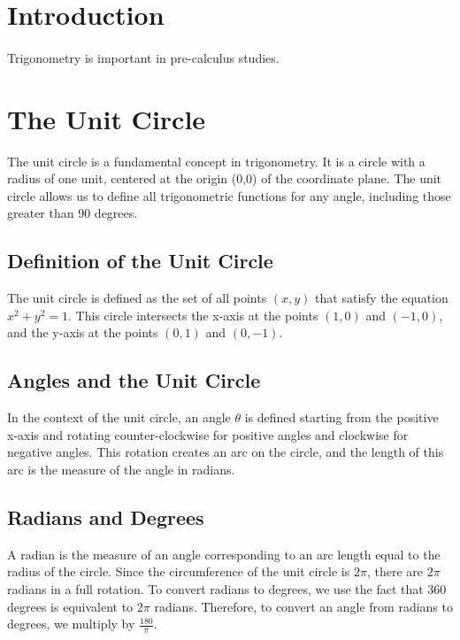 \documentclass[a4paper,12pt]{book}
\begin{document}
\section*{Introduction}
\paragraph{}
Trigonometry is important in pre-calculus studies.

\section{The Unit Circle}
\label{sec:unit_circle}

The unit circle is a fundamental concept in trigonometry. It is a circle with a radius of one unit, centered at the origin (0,0) of the coordinate plane. The unit circle allows us to define all trigonometric functions for any angle, including those greater than 90 degrees.

\subsection{Definition of the Unit Circle}
\label{subsec:unit_circle_definition}

The unit circle is defined as the set of all points \((x, y)\) that satisfy the equation \(x^2 + y^2 = 1\). This circle intersects the x-axis at the points \((1, 0)\) and \((-1, 0)\), and the y-axis at the points \((0, 1)\) and \((0, -1)\).

\subsection{Angles and the Unit Circle}
\label{subsec:angles_unit_circle}

In the context of the unit circle, an angle \(\theta\) is defined starting from the positive x-axis and rotating counter-clockwise for positive angles and clockwise for negative angles. This rotation creates an arc on the circle, and the length of this arc is the measure of the angle in radians.

\subsection{Radians and Degrees}
\label{subsec:radians_degrees}

A radian is the measure of an angle corresponding to an arc length equal to the radius of the circle. Since the circumference of the unit circle is \(2\pi\), there are \(2\pi\) radians in a full rotation. To convert radians to degrees, we use the fact that \(360\) degrees is equivalent to \(2\pi\) radians. Therefore, to convert an angle from radians to degrees, we multiply by \(\frac{180}{\pi}\).
\end{document}

